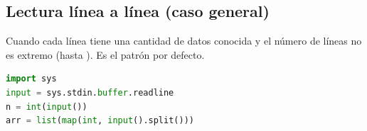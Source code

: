 \subsection{Lectura línea a línea (caso general)}
\label{alg:1-1}

Cuando cada línea tiene una cantidad de datos conocida y el número de líneas no es extremo (hasta ). Es el patrón por defecto.

\begin{lstlisting}[language=Python]
import sys
input = sys.stdin.buffer.readline
n = int(input())
arr = list(map(int, input().split()))
\end{lstlisting}
